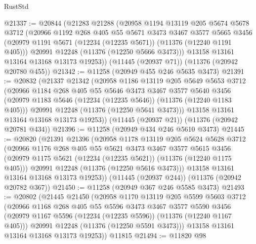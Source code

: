 \begin{lexlean}{RustStd}
\begin{coremodule}
{{{{{{{{{{{{{{{{{{{@21337 := @20844
    (@21283
      @21288
      (@20958
        @1194
        @13119
        @205
        @5674
        @5678
        @3712
        (@20966
          @1192
          @268
          @405
          @55
          @5671
          @3473
          @3467
          @3577
          @5665
          @3456
          (@20979 @1191 @5671 (@12234 (@12235 @5671)) (@11376 (@12240 @1191 @405)))
          @20991
          @12248
          (@11376 (@12250 @5666 @3473)))
        @13158
        @13161
        @13164
        @13168
        @13173
        @19253))
    (@11445 (@20937 @71))
    (@11376 (@20942 @20780 @455))
@21342 := @11258 (@20949 @455 @246 @5635 @3473)
@21391 := @20832
    (@21337
      @21342
      (@20958
        @1186
        @13119
        @205
        @5649
        @5653
        @3712
        (@20966
          @1184
          @268
          @405
          @55
          @5646
          @3473
          @3467
          @3577
          @5640
          @3456
          (@20979 @1183 @5646 (@12234 (@12235 @5646)) (@11376 (@12240 @1183 @405)))
          @20991
          @12248
          (@11376 (@12250 @5641 @3473)))
        @13158
        @13161
        @13164
        @13168
        @13173
        @19253))
    (@11445 (@20937 @21))
    (@11376 (@20942 @20781 @434))
@21396 := @11258 (@20949 @434 @246 @5610 @3473)
@21445 := @20820
    (@21391
      @21396
      (@20958
        @1178
        @13119
        @205
        @5624
        @5628
        @3712
        (@20966
          @1176
          @268
          @405
          @55
          @5621
          @3473
          @3467
          @3577
          @5615
          @3456
          (@20979 @1175 @5621 (@12234 (@12235 @5621)) (@11376 (@12240 @1175 @405)))
          @20991
          @12248
          (@11376 (@12250 @5616 @3473)))
        @13158
        @13161
        @13164
        @13168
        @13173
        @19253))
    (@11445 (@20937 @244))
    (@11376 (@20942 @20782 @367))
@21450 := @11258 (@20949 @367 @246 @5585 @3473)
@21493 := @20802
    (@21445
      @21450
      (@20958
        @1170
        @13119
        @205
        @5599
        @5603
        @3712
        (@20966
          @1168
          @268
          @405
          @55
          @5596
          @3473
          @3467
          @3577
          @5590
          @3456
          (@20979 @1167 @5596 (@12234 (@12235 @5596)) (@11376 (@12240 @1167 @405)))
          @20991
          @12248
          (@11376 (@12250 @5591 @3473)))
        @13158
        @13161
        @13164
        @13168
        @13173
        @19253))
    @11815
@21494 := @11820 @98
}}}}}}}}}}}}}}}}}}}
\end{coremodule}
\end{lexlean}
